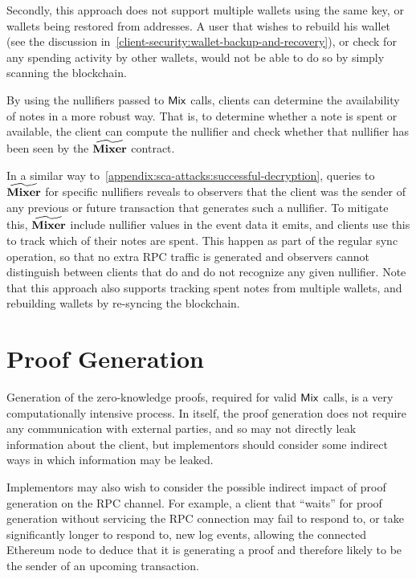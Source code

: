 Secondly, this approach does not support multiple wallets using the same key, or wallets being restored from \zeth{} addresses. A user that wishes to rebuild his wallet (see the discussion in~\cref{client-security:wallet-backup-and-recovery}), or check for any spending activity by other wallets, would not be able to do so by simply scanning the blockchain.

By using the nullifiers passed to $\mathsf{Mix}$ calls, clients can determine the availability of notes in a more robust way. That is, to determine whether a note is spent or available, the client can compute the nullifier and check whether that nullifier has been seen by the $\widetilde{\mathbf{Mixer}}$ contract.

In a similar way to~\cref{appendix:sca-attacks:successful-decryption}, queries to $\widetilde{\mathbf{Mixer}}$ for specific nullifiers reveals to observers that the client was the sender of any previous or future transaction that generates such a nullifier. To mitigate this, $\widetilde{\mathbf{Mixer}}$ \MUST{} include nullifier values in the event data it emits, and clients \SHOULD{} use this to track which of their notes are spent. This \MUST{} happen as part of the regular sync operation, so that no extra RPC traffic is generated and observers cannot distinguish between clients that do and do not recognize any given nullifier. Note that this approach also supports tracking spent notes from multiple wallets, and rebuilding wallets by re-syncing the blockchain.

\section{Proof Generation}\label{appendix:sca-attacks:proof-generation}

Generation of the zero-knowledge proofs, required for valid $\mathsf{Mix}$ calls, is a very computationally intensive process. In itself, the proof generation does not require any communication with external parties, and so may not directly leak information about the client, but implementors should consider some indirect ways in which information may be leaked.

Implementors may also wish to consider the possible indirect impact of proof generation on the RPC channel. For example, a client that ``waits'' for proof generation without servicing the RPC connection may fail to respond to, or take significantly longer to respond to, new log events, allowing the connected Ethereum node to deduce that it is generating a proof and therefore likely to be the sender of an upcoming transaction.


